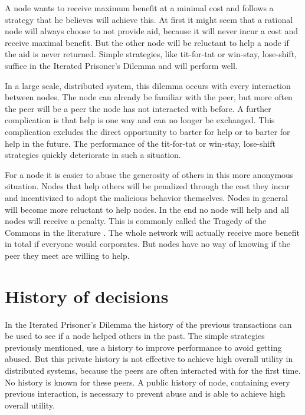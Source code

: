 A node wants to receive maximum benefit at a minimal cost
and follows a strategy that he believes will achieve this.
At first it might seem that a rational node will always choose to not provide aid,
because it will never incur a cost and receive maximal benefit.
But the other node will be reluctant to help a node if the aid is never returned.
Simple strategies, like tit-for-tat or win-stay, lose-shift, suffice in the Iterated Prisoner's Dilemma
and will perform well\cite{Nowak-Cooperation}.

In a large scale, distributed system, this dilemma occurs with every interaction between nodes.
The node can already be familiar with the peer,
but more often the peer will be a peer the node has not interacted with before.
A further complication is that help is one way and can no longer be exchanged.
This complication excludes the direct opportunity to barter for help 
or to barter for help in the future\cite{Lai-Incentives}.
The performance of the tit-for-tat or win-stay, lose-shift strategies
quickly deteriorate in such a situation.

For a node it is easier to abuse the generosity of others in this more anonymous situation.
Nodes that help others will be penalized through the cost they incur
and incentivized to adopt the malicious behavior themselves.
Nodes in general will become more reluctant to help nodes\cite{Nowak-PrisonerDilemma}.
In the end no node will help and all nodes will receive a penalty.
This is commonly called the Tragedy of the Commons in the literature \cite{hardin-tragedy}.
The whole network will actually receive more benefit in total if everyone would corporates.
But nodes have no way of knowing if the peer they meet are willing to help.

\section{History of decisions}

In the Iterated Prisoner's Dilemma the history of the previous transactions can be used 
to see if a node helped others in the past.
The simple strategies previously mentioned, use a history to improve performance to avoid getting abused.
But this private history is not effective to achieve high overall utility in distributed systems,
because the peers are often interacted with for the first time.
No history is known for these peers.
A public history of node, containing every previous interaction, is necessary to prevent abuse
and is able to achieve high overall utility\cite{Lai-Incentives}.

